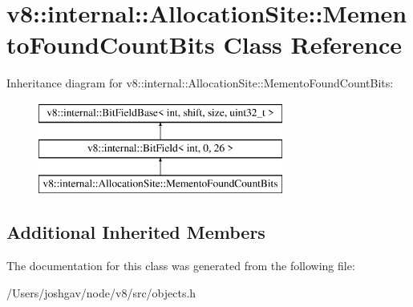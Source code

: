 \hypertarget{classv8_1_1internal_1_1_allocation_site_1_1_memento_found_count_bits}{}\section{v8\+:\+:internal\+:\+:Allocation\+Site\+:\+:Memento\+Found\+Count\+Bits Class Reference}
\label{classv8_1_1internal_1_1_allocation_site_1_1_memento_found_count_bits}
Inheritance diagram for v8\+:\+:internal\+:\+:Allocation\+Site\+:\+:Memento\+Found\+Count\+Bits\+:\begin{figure}[H]
\begin{center}
\leavevmode
\includegraphics[height=3.000000cm]{classv8_1_1internal_1_1_allocation_site_1_1_memento_found_count_bits}
\end{center}
\end{figure}
\subsection*{Additional Inherited Members}


The documentation for this class was generated from the following file\+:\begin{DoxyCompactItemize}
\item 
/\+Users/joshgav/node/v8/src/objects.\+h\end{DoxyCompactItemize}
